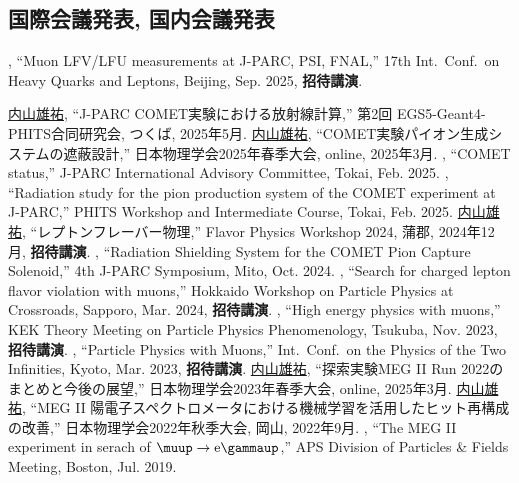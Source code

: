 \subsection{国際会議発表, 国内会議発表}
\begin{enumerate}
\setcounter{enumi}{38}
	\setlength{\itemsep}{-1pt}
	
 	 \me, ``Muon LFV/LFU measurements at J-PARC, PSI, FNAL,''
  	17th Int.\ Conf.\ on Heavy Quarks and Leptons, Beijing, Sep. 2025, \textbf{招待講演}.

  	\underline{内山雄祐},  	``J-PARC COMET実験における放射線計算,''
  	第2回 EGS5-Geant4-PHITS合同研究会, つくば,  2025年5月.
  	\underline{内山雄祐},  	``COMET実験パイオン生成システムの遮蔽設計,''
  	日本物理学会2025年春季大会, online,  2025年3月.
  	\me, ``COMET status,''
 	 J-PARC International Advisory Committee, Tokai, Feb. 2025.
  	\me, ``Radiation study for the pion production system of the COMET experiment at J-PARC,''
 	 PHITS Workshop and Intermediate Course, Tokai, Feb. 2025.
  	\underline{内山雄祐},  	``レプトンフレーバー物理,''
  	Flavor Physics Workshop 2024, 蒲郡,  2024年12月, \textbf{招待講演}.
  	\me, ``Radiation Shielding System for the COMET Pion Capture Solenoid,''
  	4th J-PARC Symposium, Mito, Oct. 2024.
 	 \me, ``Search for charged lepton flavor violation with muons,''
  	Hokkaido Workshop on Particle Physics at Crossroads, Sapporo, Mar. 2024, \textbf{招待講演}.
 	 \me, ``High energy physics with muons,''
  	KEK Theory Meeting on Particle Physics Phenomenology, Tsukuba, Nov. 2023, \textbf{招待講演}.
 	 \me, ``Particle Physics with Muons,''
  	Int.\ Conf.\ on the Physics of the Two Infinities, Kyoto, Mar. 2023, \textbf{招待講演}.
  	\underline{内山雄祐},  	``\megc 探索実験MEG II Run 2022のまとめと今後の展望,''
  	日本物理学会2023年春季大会, online,  2025年3月.
  	\underline{内山雄祐},  	``MEG II 陽電子スペクトロメータにおける機械学習を活用したヒット再構成の改善,''
  	日本物理学会2022年秋季大会,  岡山,  2022年9月.
 	 \me, ``The MEG II experiment in serach of $\meg$,''
  	APS Division of Particles \& Fields Meeting, Boston, Jul. 2019.
  	

\end{enumerate}
